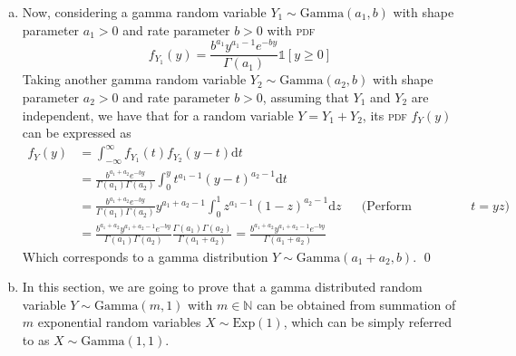 \begin{enumerate} [(a)]
\begin{lstlisting} [language=Python]
# compute the variance of an exponential distribution with parameter lamb.
def exp_var(lamb):
	return 1/(lamb)**2

lamb = 1.5
n = 100000
x = rand_exp(lamb, n)

print(f'true mean {exp_mean(lamb)}, empirical mean {x.mean()}')
print(f'true variance {exp_var(lamb)}, empirical variance {x.var()}')
	\end{lstlisting}
	Here are the results we obtained while executing the code.
	\begin{verbatim}
true mean 0.6666666666666666, empirical mean 0.6656982498031476
true variance 0.4444444444444444, empirical variance 0.44331074868144876
	\end{verbatim}
	The negligible difference between true and empirical mean and variance here shows that the implementation at \ref{1(a)} works properly.
	\item \label{1(d)} Now, considering a gamma random variable $Y_1 \sim \mathrm{Gamma}(a_1,b)$ with shape parameter $a_1 > 0$ and rate parameter $b > 0$ with \textsc{pdf}
	\begin{equation*}
		f_{Y_1}(y) = \frac{b^{a_1} y^{a_1 - 1} e^{-by}}{\Gamma(a_1)} \mathds{1}\!\left[y \geq 0\right]
	\end{equation*}
	Taking another gamma random variable $Y_2 \sim \mathrm{Gamma}(a_2,b)$ with shape parameter $a_2 > 0$ and rate parameter $b > 0$, assuming that $Y_1$ and $Y_2$ are independent, we have that for a random variable $Y = Y_1 + Y_2$, its \textsc{pdf} $f_Y(y)$ can be expressed as
	\begin{equation*}
		\begin{aligned}
			f_Y(y) &= \int_{-\infty}^{\infty} f_{Y_1}(t) f_{Y_2}(y-t) \mathrm{d}t \\
			&= \frac{b^{a_1+a_2}e^{-by}}{\Gamma(a_1)\Gamma(a_2)} \int_0^y t^{a_1-1} (y-t)^{a_2-1} \mathrm{d}t \\
			&= \frac{b^{a_1+a_2}e^{-by}}{\Gamma(a_1)\Gamma(a_2)} y^{a_1+a_2-1} \int_0^1 z^{a_1-1} (1-z)^{a_2-1} \mathrm{d}z && \text{(Perform substitution $t = yz$)} \\
			&= \frac{b^{a_1+a_2}y^{a_1+a_2-1}e^{-by}}{\Gamma(a_1)\Gamma(a_2)} \frac{\Gamma(a_1)\Gamma(a_2)}{\Gamma(a_1+a_2)} = \frac{b^{a_1+a_2}y^{a_1+a_2-1}e^{-by}}{\Gamma(a_1+a_2)}
		\end{aligned}
	\end{equation*}
	Which corresponds to a gamma distribution $Y \sim \mathrm{Gamma}(a_1+a_2, b)$. \qed
	\item \label{1(e)} In this section, we are going to prove that a gamma distributed random variable $Y \sim \mathrm{Gamma}(m, 1)$ with $m \in \mathbb{N}$ can be obtained from summation of $m$ exponential random variables $X \sim \mathrm{Exp}(1)$, which can be simply referred to as $X \sim \mathrm{Gamma}(1,1)$. \\

\end{enumerate}
